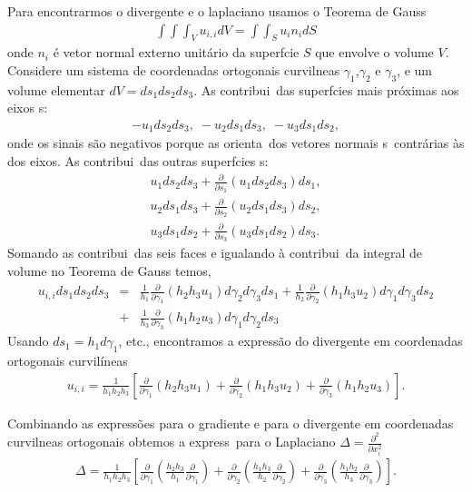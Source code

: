 Para encontrarmos o divergente e o laplaciano usamos o Teorema de Gauss
\begin{eqnarray*}
\int\!\!\!\int\!\!\!\int_{V} u_{i,i}dV = \int\!\!\!\int_{S} u_{i}n_{i}dS
\end{eqnarray*}
onde $n_{i}$ \'e vetor normal externo unit\'ario da superf\ih cie $S$ que envolve o volume $V$. 
Considere um sistema de coordenadas ortogonais curvil\ih neas $\gamma_{1}$,$\gamma_{2}$ e $\gamma_{3}$, 
e um volume elementar $dV = ds_{1}ds_{2}ds_{3}$. As contribui\coes\ das superf\ih cies mais pr\'oximas aos eixos s\ao:
\begin{eqnarray*}
-u_{1}ds_{2}ds_{3}, \; -u_{2}ds_{1}ds_{3}, \; -u_{3}ds_{1}ds_{2},
\end{eqnarray*}
onde os sinais s\~ao negativos porque as orienta\coes\ dos vetores normais s\ao\ contr\'arias \`as dos eixos.
As contribui\coes\ das outras superf\ih cies s\ao:
\begin{eqnarray*}
u_{1}ds_{2}ds_{3}+\frac{\partial}{\partial s_{1}}(u_{1}ds_{2}ds_{3})ds_{1},\\
u_{2}ds_{1}ds_{3}+\frac{\partial}{\partial s_{2}}(u_{2}ds_{1}ds_{3})ds_{2},\\
u_{3}ds_{1}ds_{2}+\frac{\partial}{\partial s_{3}}(u_{3}ds_{1}ds_{2})ds_{3}.
\end{eqnarray*}
Somando as contribui\coes\ das seis faces e igualando \`a contribui\cao\ da integral de volume no Teorema de Gauss temos,
\begin{eqnarray*}
u_{i,i} ds_1 ds_2 ds_3 &=& \frac{1}{h_1}\frac{\partial}{\partial \gamma_1} (h_2 h_3 u_1) d\gamma_2 d\gamma_3 ds_1 
 + \frac{1}{h_{2}}\frac{\partial}{\partial \gamma_{2}}(h_{1}h_{3}u_{2})d\gamma_{1}d\gamma_{3}ds_{2} \\ 
&+&\frac{1}{h_{3}}\frac{\partial}{\partial \gamma_{3}}(h_{1}h_{2}u_{3})d\gamma_{1}d\gamma_{2}ds_{3}
\end{eqnarray*}
Usando $ds_{1} = h_{1}d\gamma_{1}$, etc., encontramos a express\~ao do divergente em coordenadas
ortogonais curvil\'ineas 
\begin{eqnarray*}
u_{i,i}=\frac{1}{h_{1}h_{2}h_{3}}\left[\frac{\partial}{\partial\gamma_{1}}(h_{2}h_{3}u_{1}) 
       +\frac{\partial}{\partial \gamma_{2}}(h_{1}h_{3}u_{2})  
       +\frac{\partial}{\partial \gamma_{3}}(h_{1}h_{2}u_{3})\right].
\end{eqnarray*}

Combinando as express\~oes para o gradiente e para o divergente em coordenadas curvil\ih neas ortogonais obtemos a express\ao\ para o 
Laplaciano $\Delta = \frac{\partial^{2}}{\partial x_{i}^{2}}$
\begin{eqnarray}
\Delta = \frac{1}{h_1 h_2 h_3}\left[\frac{\partial}{\partial\gamma_1}\left(\frac{h_2 h_3}{h_1}\frac{\partial}{\partial\gamma_1}\right)
+\frac{\partial}{\partial\gamma_{2}}\left(\frac{h_{1}h_{3}}{h_{2}}\frac{\partial}{\partial\gamma_{2}}\right)+
 \frac{\partial}{\partial\gamma_{3}}\left(\frac{h_{1}h_{2}}{h_{3}}\frac{\partial}{\partial\gamma_{3}}\right)\right].
\end{eqnarray}

